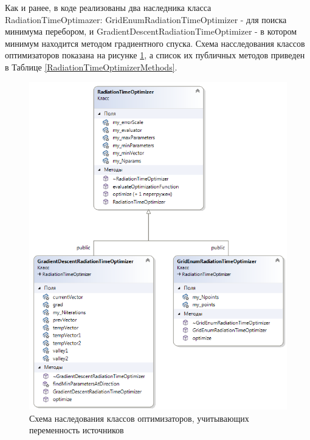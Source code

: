 Как и ранее, в коде реализованы два наследника класса RadiationTimeOptimazer: GridEnumRadiationTimeOptimizer - для поиска минимума перебором, и GradientDescentRadiationTimeOptimizer - в котором минимум находится методом градиентного спуска. Схема насследования классов оптимизаторов показана на рисунке \ref{radiationOptimizerTime}, а список их публичных методов приведен в Таблице \ref{RadiationTimeOptimizerMethods}.
\begin{figure}
	\centering
	\includegraphics[width=10.5 cm]{./fig/radiationOptimizerTime.png} 
	\caption{Схема наследования классов оптимизаторов, учитывающих переменность источников}
	\label{radiationOptimizerTime}
\end{figure}

